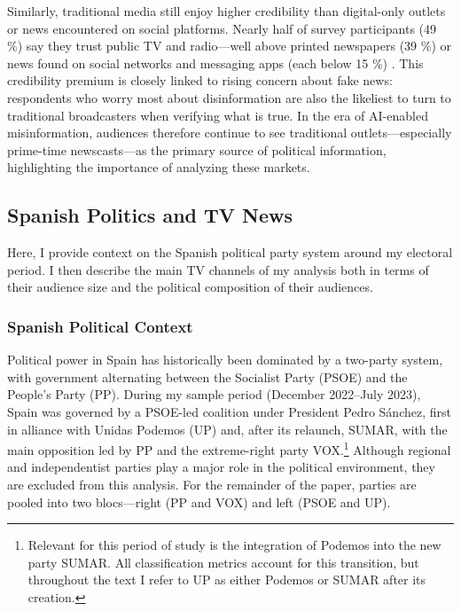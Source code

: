 \documentclass[12pt]{article}
\begin{document}
	

	
	
Similarly, traditional media still enjoy higher credibility than digital-only outlets or news encountered on social platforms. Nearly half  of survey participants (49 \%) say they trust public TV and radio—well above printed newspapers (39 \%) or news found on social networks and messaging apps (each below 15 \%) \citep{eurobarometer2022}. This credibility premium is closely linked to rising concern about fake news: respondents who worry most about disinformation are also the likeliest to turn to traditional broadcasters when verifying what is true. In the era of AI-enabled misinformation, audiences therefore continue to see traditional outlets—especially prime-time newscasts—as the primary source of political information, highlighting the importance of analyzing these markets. 
	
	
	
	
	
	
	\subsection{Spanish Politics and TV News}
	
	
	
Here, I provide context on the Spanish political party system around my electoral period. I then describe the main TV channels of my analysis both in terms of their audience size and  the political composition of their audiences. 

	
	
	
	\subsubsection*{Spanish Political Context}
	

	

	
	
	Political power in Spain has historically been dominated by a two-party system, with government alternating between the Socialist Party (PSOE) and the People’s Party (PP). During my sample period (December 2022–July 2023), Spain was governed by a PSOE-led coalition under President Pedro Sánchez, first in alliance with Unidas Podemos (UP) and, after its relaunch, SUMAR,  with the main opposition led by PP and the extreme-right party VOX.\footnote{Relevant for this period of study is the integration of Podemos into the new party SUMAR. All classification metrics account for this transition, but throughout the text I refer to UP as either Podemos or SUMAR after its creation.} Although regional and independentist parties play a major role in the political environment, they are excluded from this analysis. For the remainder of the paper, parties are pooled into two blocs—right (PP and VOX) and left (PSOE and UP).
	
\end{document}
